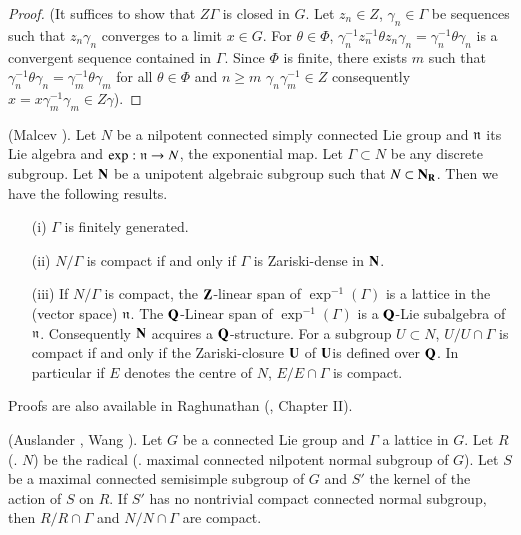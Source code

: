 \begin{proof}
(It suffices to show that $Z\Gamma$ is closed in $G$. Let $z_n \in Z$, $\gamma_n \in \Gamma$ be sequences such that $z_n \gamma_n$ converges to a limit $x \in G$. For $\theta \in \Phi$, $\gamma^{-1}_n z^{-1}_n \theta z_n \gamma_n = \gamma_n^{-1} \theta \gamma_n$ is a convergent sequence contained in $\Gamma$. Since $\Phi$ is finite, there exists $m$ such that $\gamma^{-1}_n \theta \gamma_n = \gamma^{-1}_m \theta \gamma_m$ for all $\theta \in \Phi$ and $n \geqslant m$ \ie $\gamma_n \gamma^{-1}_m \in Z$ consequently $x = x \gamma^{-1}_m \gamma_m \in Z \gamma$).
\end{proof}

\begin{romantheorem}{\rm (Malcev \cite{art9-malcev-1}).}\label{art9-romanthm2}
Let $N$ be a nilpotent connected simply connected Lie group and $\mathfrak{n}$ its Lie algebra and $\exp: \mathfrak{n} \to N$, the exponential map. Let $\Gamma \subset N$ be any discrete subgroup. Let $\mathbf{N}$ be a unipotent algebraic subgroup such that $N \subset \mathbf{N}_{\mathbf{R}}$. Then we have the following results.
\begin{itemize}
\item[(i)] $\Gamma$ is finitely generated.

\item[(ii)] $N/\Gamma$ is compact if and only if $\Gamma$ is Zariski-dense in $\mathbf{N}$.

\item[(iii)] If $N/ \Gamma$ is compact, the $\mathbf{Z}$-linear span of $\exp^{-1} (\Gamma)$ is a lattice in the (vector space) $\mathfrak{n}$. The $\mathbf{Q}$-Linear span of $\exp^{-1} (\Gamma)$ is a $\mathbf{Q}$-Lie subalgebra of $\mathfrak{n}$. Consequently $\mathbf{N}$ acquires a $\mathbf{Q}$-structure. For a subgroup $U \subset N$, $U/U \cap \Gamma$ is compact if and only if the Zariski-closure $\mathbf{U}$ of $\mathbf{U}$\pageoriginale is defined over $\mathbf{Q}$. In particular if $E$ denotes the centre of $N$, $E/E \cap \Gamma$ is compact.
\end{itemize}
\end{romantheorem}

Proofs are also available in Raghunathan (\cite{art9-raghunathan-1}, Chapter II).

\begin{romantheorem}{\rm (Auslander \cite{art9-auslander-1}, Wang \cite{art9-wang-1}).}\label{art9-romanthm3}
Let $G$ be a connected Lie group and $\Gamma$ a lattice in $G$. Let $R$ (\resp. $N$) be the radical (\resp. maximal connected nilpotent normal subgroup of $G$). Let $S$ be a maximal connected semisimple subgroup of $G$ and $S'$ the kernel of the action of $S$ on $R$. If $S'$ has no nontrivial compact connected normal subgroup, then $R/R \cap \Gamma$ and $N/N \cap \Gamma$ are compact.
\end{romantheorem}

